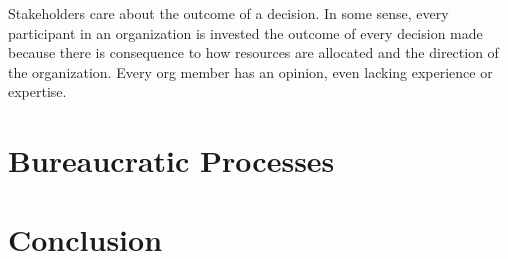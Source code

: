 \documentclass{book}
\begin{document}
    Stakeholders care about the outcome of a decision. 
    In some sense, every participant in an organization is invested the outcome of every decision made because there is consequence to how resources are allocated and the direction of the organization. Every org member has an opinion, even lacking experience or expertise. 
    
    
    
%    
    
%    
%    
  \chapter{Bureaucratic Processes\label{sec:process}}
    
    
    
    
    
    
    
    
    
    
    
  \clearpage

\clearpage
\chapter{Conclusion}


\end{document}
